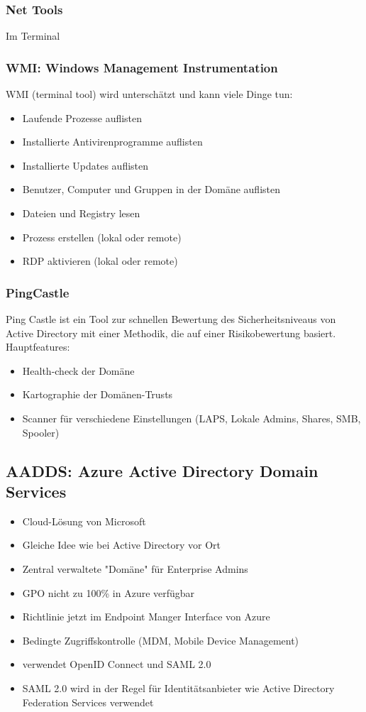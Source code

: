\subsubsection{Net Tools}
Im Terminal

\subsubsection{WMI: Windows Management Instrumentation}
WMI (terminal tool) wird unterschätzt und kann viele Dinge tun:
\begin{itemize}
    \item Laufende Prozesse auflisten
    \item Installierte Antivirenprogramme auflisten
    \item Installierte Updates auflisten
    \item Benutzer, Computer und Gruppen in der Domäne auflisten
    \item Dateien und Registry lesen
    \item Prozess erstellen (lokal oder remote)
    \item RDP aktivieren (lokal oder remote)
\end{itemize}

\subsubsection{PingCastle}
Ping Castle ist ein Tool zur schnellen Bewertung des Sicherheitsniveaus von Active Directory mit einer Methodik, die auf einer Risikobewertung basiert. Hauptfeatures:
\begin{itemize}
    \item Health-check der Domäne
    \item Kartographie der Domänen-Trusts
    \item Scanner für verschiedene Einstellungen (LAPS, Lokale Admins, Shares, SMB, Spooler)
\end{itemize}

\subsection{AADDS: Azure Active Directory Domain Services}\label{subsec:aadds}
\begin{itemize}
    \item Cloud-Lösung von Microsoft
    \item Gleiche Idee wie bei Active Directory vor Ort
    \item Zentral verwaltete "Domäne" für Enterprise Admins
    \item GPO nicht zu 100\% in Azure verfügbar
    \item Richtlinie jetzt im Endpoint Manger Interface von Azure
    \item Bedingte Zugriffskontrolle (MDM, Mobile Device Management)
    \item verwendet OpenID Connect und SAML 2.0
    \item SAML 2.0 wird in der Regel für Identitätsanbieter wie Active Directory Federation Services verwendet
\end{itemize}

